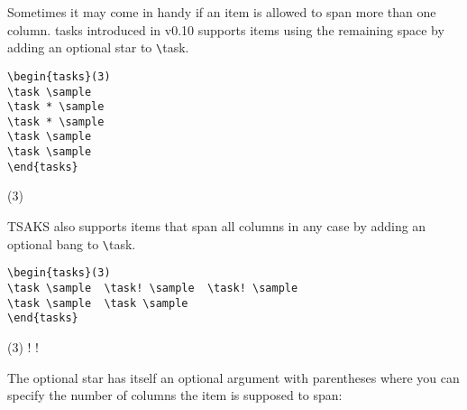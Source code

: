 \documentclass[a4paper,12pt,indent]{article}
\begin{document}
Sometimes it may come in handy if an item is allowed to span more than one column. tasks introduced in
v0.10
supports items using the remaining space by adding an optional star to \verb|\|\textcolor{Tasks}{task}.

\begin{tcolorbox}[collower=black,colframe=Tasks,colback=white]
    \begin{lstlisting}
\begin{tasks}(3)
\task \sample
\task * \sample
\task * \sample
\task \sample
\task \sample
\end{tasks}
    \end{lstlisting}
    \tcblower
    \begin{tasks}(3)
        \task \sample
        \task * \sample
        \task * \sample
        \task \sample
        \task \sample
        \end{tasks}
    \end{tcolorbox}

 TSAKS also supports items that span all columns in any case by adding an optional bang to \verb|\|\textcolor{Tasks}{task}.

 \begin{tcolorbox}[collower=black,colframe=Tasks,colback=white]
    \begin{lstlisting}
\begin{tasks}(3)
\task \sample  \task! \sample  \task! \sample
\task \sample  \task \sample
\end{tasks}
    \end{lstlisting}
    \end{tcolorbox}

    \begin{tcolorbox}[collower=black,colframe=Tasks,colback=white]
        \tcblower
        \begin{tasks}(3)
            \task \sample
            \task! \sample
            \task! \sample
            \task \sample
            \task \sample
            \end{tasks}
        \end{tcolorbox}

The optional star has itself an optional argument with parentheses where you can specify
the number of columns the item is supposed to span:
\end{document}
